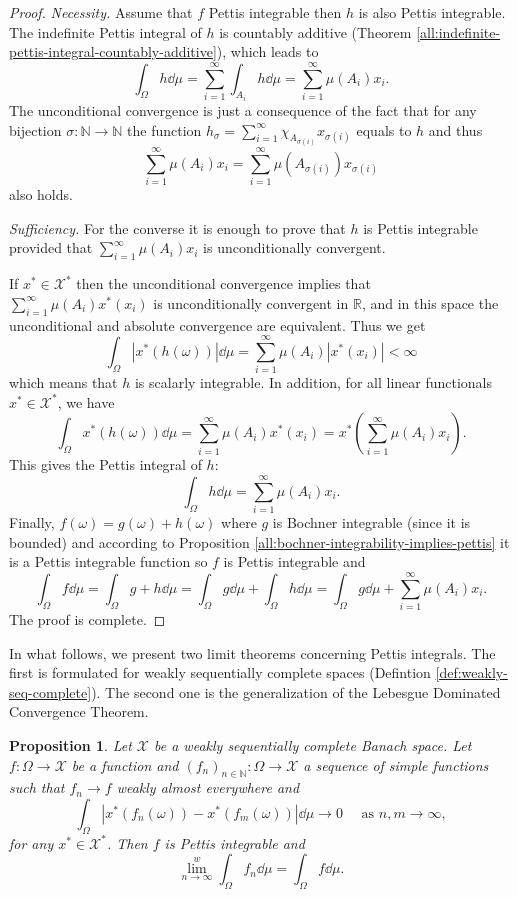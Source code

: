 \documentclass[a4paper, 12pt]{article}
\newtheorem{state}[lem]{Proposition}
\begin{document}
\begin{proof} \emph{Necessity.} Assume that $f$ Pettis integrable then $h$ is also Pettis integrable. The indefinite Pettis integral of $h$ is countably additive (Theorem \ref{all:indefinite-pettis-integral-countably-additive}), which leads to
$$\int_{\Omega} h \dd{\mu} = \sum^{\infty}_{i=1} \int_{A_i} h \dd{\mu} = \sum^{\infty}_{i = 1} \mu(A_i) x_i.$$
The unconditional convergence is just a consequence of the fact that for any bijection $\sigma \colon \mathbb{N} \to \mathbb{N}$ the function 
$h_{\sigma} = \sum^{\infty}_{i = 1} \chi_{A_{\sigma(i)}} x_{\sigma(i)}$ equals to $h$ and thus
$$\sum^{\infty}_{i = 1} \mu(A_i) x_i = \sum^{\infty}_{i = 1} \mu(A_{\sigma(i)}) x_{\sigma(i)}$$
also holds.

\emph{Sufficiency.} For the converse it is enough to prove that $h$ is Pettis integrable provided that $\sum^{\infty}_{i=1}\mu(A_i) x_i$ is unconditionally convergent.

If $x^* \in \mathcal{X}^*$ then the unconditional convergence implies that $\sum^{\infty}_{i=1} \mu(A_i) x^*(x_i)$ is unconditionally convergent in $\mathbb{R}$, and in this space the unconditional and absolute convergence are equivalent. Thus we get
$$
\int_{\Omega} | x^*(h(\omega)) | \dd{\mu} = \sum^{\infty}_{i=1} \mu(A_i) | x^*(x_i) | < \infty
$$
which means that $h$ is scalarly integrable. In addition, for all linear functionals $x^* \in \mathcal{X}^*$, we have
$$
\int_{\Omega} x^*(h(\omega)) \dd{\mu} = \sum^{\infty}_{i = 1} \mu(A_i) x^*(x_i) = x^*\left(\sum^{\infty}_{i = 1} \mu(A_i) x_i \right).
$$
This gives the Pettis integral of $h$:
$$
\int_{\Omega} h \dd{\mu} = \sum^{\infty}_{i = 1} \mu(A_i) x_i.
$$
Finally, $f(\omega) = g(\omega) + h(\omega)$ where $g$ is Bochner integrable (since it is bounded) and according to Proposition \ref{all:bochner-integrability-implies-pettis} it is a Pettis integrable function so $f$ is Pettis integrable and
$$
\int_{\Omega} f \dd{\mu} = \int_{\Omega} g + h \dd{\mu} = \int_{\Omega} g \dd{\mu} + \int_{\Omega} h \dd{\mu} = \int_{\Omega} g \dd{\mu} + \sum^{\infty}_{i = 1} \mu(A_i) x_i.
$$
The proof is complete.
\end{proof}
In what follows, we present two limit theorems concerning Pettis integrals. The first is formulated for weakly sequentially complete spaces (Defintion \ref{def:weakly-seq-complete}). The second one is the generalization of the Lebesgue Dominated Convergence Theorem.
\begin{state} Let $\mathcal{X}$ be a weakly sequentially complete Banach space. Let $f\colon\Omega \to \mathcal{X}$ be a function and $(f_n)_{n \in \mathbb{N}} \colon \Omega \to \mathcal{X}$ a sequence of simple functions such that $f_n \to f$ weakly almost everywhere and
$$
\int_{\Omega} |x^*(f_n(\omega)) - x^*(f_m(\omega))| \dd{\mu} \to 0 \quad \text{ as } n,m \to \infty,
$$
for any $x^* \in \mathcal{X}^*$. Then $f$ is Pettis integrable and
$$
\lim^{w}_{n \to \infty} \int_{\Omega} f_n \dd{\mu} = \int_{\Omega} f \dd{\mu}.
$$
\end{state}
\end{document}
